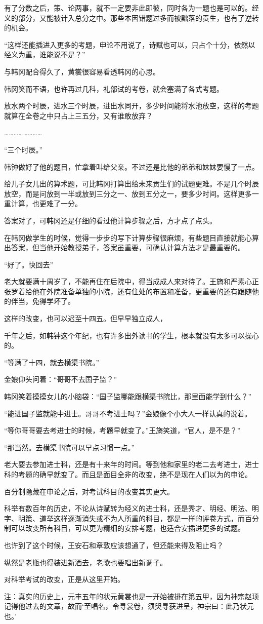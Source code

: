 有了分数之后，策、论两事，就不一定要非此即彼，同时各为一题也是可以的。经义的部分，又能被计入总分之中。那些本因错题过多而被黜落的贡生，也有了逆转的机会。

“这样还能插进入更多的考题，申论不用说了，诗赋也可以，只占个十分，依然以经义为重，谁能说不是？”

与韩冈配合得久了，黄裳很容易看透韩冈的心思。

韩冈笑而不语，也许再过几科，礼部试的考卷，就会塞满了各式考题。

放水两个时辰，进水三个时辰，进出水同开，多少时间能将水池放空，这样的考题就算在全卷之中只占上三五分，又有谁敢放弃？

……………………

“三个时辰。”

韩钟做好了他的题目，忙拿着叫给父亲。不过还是比他的弟弟和妹妹要慢了一点。

给儿子女儿出的算术题，可比韩冈打算出给未来贡生们的试题更难。不是几个时辰放空，而是问放到一半或放到三分之一、放到五分之一，要多少时间。这样更多一重计算，也更难了一分。

答案对了，可韩冈还是仔细的看过他计算步骤之后，方才点了点头。

在韩冈做学生的时候，觉得一步步的写下计算步骤很麻烦，有些题目直接就能心算出答案，但当他开始教授弟子，答案虽重要，可确认计算方法才是最重要的。

“好了。快回去”

老大就要满十周岁了，不能再住在后院中，得当成成人来对待了。王旖和严素心正张罗着给他在外院准备单独的小院，还有住处的布置和准备，更重要的还有跟随他的伴当，免得学坏了。

这样的改变，也可以迟至十四五。但早早独立成人，

千年之后，如韩钟这个年纪，也有许多出外读书的学生，根本就没有太多可以操心的。

“等满了十四，就去横渠书院。”

金娘仰头问着：“哥哥不去国子监？”

韩冈笑着摸摸女儿的小脑袋：“国子监哪能跟横渠书院比，那里面能学到什么？”

“能进国子监就能中进士。哥哥不考进士吗？”金娘像个小大人一样认真的说着。

“等你哥哥要去考进士的时候，考题早就变了。”王旖笑道，“官人，是不是？”

“那当然。去横渠书院可以早点习惯一点。”

老大要去参加进士科，还是有十来年的时间。等到他和家里的老二去考进士，进士科的考题的确早就变了。而且是面目全非的改变，绝不是现在人们以为的申论。

百分制隐藏在申论之后，对考试科目的改变其实更大。

科举有数百年的历史，不论从诗赋转为经义的进士科，还是秀才、明经、明法、明字、明策、道举这样逐渐消失或不为人所重的科目，都是一样的评卷方式，而百分制可以改变所有科目，可以更为精细的安排考题，也适合安插进更多的试题。

也许到了这个时候，王安石和章敦应该想通了，但还能来得及阻止吗？

纵然是老瓶也得装进新酒去，老歌也要唱出新调子。

对科举考试的改变，正是从这里开始。

注：真实的历史上，元丰五年的状元黄裳也是一开始被排在第五甲，因为神宗赵顼记得他过去的文章，故而‘至唱名，令寻裳卷，须臾寻获进呈，神宗曰：此乃状元也。’
